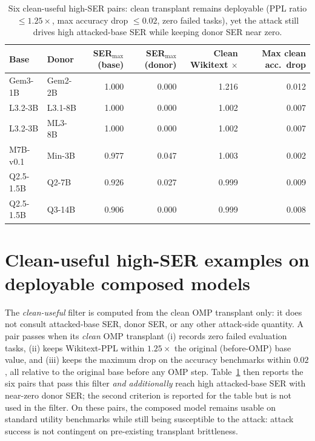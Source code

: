\documentclass{article}
\theoremstyle{plain}
\theoremstyle{definition}
\theoremstyle{remark}
\begin{document}





\begin{table}[t]
\centering
\small
\caption{Six clean-useful high-SER pairs: clean transplant remains deployable (PPL ratio $\le 1.25\times$, max accuracy drop $\le 0.02$, zero failed tasks), yet the attack still drives high attacked-base SER while keeping donor SER near zero.}
\label{tab:clean-useful}
\begin{tabular}{llrrrr}
\toprule
Base & Donor & SER$_{\max}$(base) & SER$_{\max}$(donor) & Clean Wikitext $\times$ & Max clean acc.\ drop \\
\midrule
Gem3-1B   & Gem2-2B & 1.000 & 0.000 & 1.216 & 0.012 \\
L3.2-3B   & L3.1-8B & 1.000 & 0.000 & 1.002 & 0.007 \\
L3.2-3B   & ML3-8B  & 1.000 & 0.000 & 1.002 & 0.007 \\
M7B-v0.1  & Min-3B  & 0.977 & 0.047 & 1.003 & 0.002 \\
Q2.5-1.5B & Q2-7B   & 0.926 & 0.027 & 0.999 & 0.009 \\
Q2.5-1.5B & Q3-14B  & 0.906 & 0.000 & 0.999 & 0.008 \\
\bottomrule
\end{tabular}
\end{table}

\section{Clean-useful high-SER examples on deployable composed models}
\label{app:clean_useful}

The \emph{clean-useful} filter is computed from the clean OMP transplant only: it does not consult attacked-base SER, donor SER, or any other attack-side quantity. A pair passes when its \emph{clean} OMP transplant (i) records zero failed evaluation tasks, (ii) keeps Wikitext-PPL within $1.25\times$ the original (before-OMP) base value, and (iii) keeps the maximum drop on the accuracy benchmarks within $0.02$, all relative to the original base before any OMP step. Table~\ref{tab:clean-useful} then reports the six pairs that pass this filter \emph{and additionally} reach high attacked-base SER with near-zero donor SER; the second criterion is reported for the table but is not used in the filter.
On these pairs, the composed model remains usable on standard utility benchmarks while still being susceptible to the attack: attack success is not contingent on pre-existing transplant brittleness.
\end{document}
